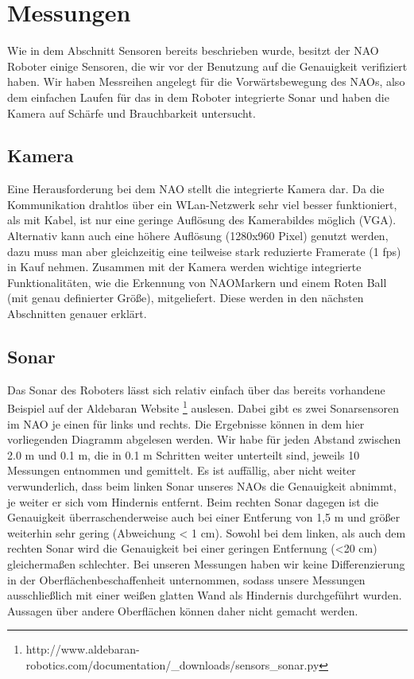 \section{Messungen}
Wie in dem Abschnitt Sensoren bereits beschrieben wurde, besitzt der NAO Roboter einige Sensoren, die wir vor der Benutzung auf die Genauigkeit verifiziert haben.
Wir haben Messreihen angelegt für die Vorwärtsbewegung des NAOs, also dem einfachen Laufen für das in dem Roboter integrierte Sonar und haben die Kamera auf Schärfe und Brauchbarkeit untersucht.

\subsection{Kamera}
Eine Herausforderung bei dem NAO stellt die integrierte Kamera dar. Da die Kommunikation drahtlos über ein WLan-Netzwerk sehr viel besser funktioniert, als mit Kabel, ist nur eine geringe Auflösung des Kamerabildes möglich (VGA). Alternativ kann auch eine höhere Auflösung (1280x960 Pixel) genutzt werden, dazu muss man aber gleichzeitig eine teilweise stark reduzierte Framerate (1 fps) in Kauf nehmen.
Zusammen mit der Kamera werden wichtige integrierte Funktionalitäten, wie die Erkennung von NAOMarkern und einem Roten Ball (mit genau definierter Größe), mitgeliefert. Diese werden in den nächsten Abschnitten genauer erklärt.

\subsection{Sonar}
Das Sonar des Roboters lässt sich relativ einfach über das bereits vorhandene Beispiel auf der Aldebaran Website%
	\footnote{http://www.aldebaran-robotics.com/documentation/\_downloads/sensors\_sonar.py} auslesen. Dabei gibt es zwei Sonarsensoren im NAO je einen für links und rechts. Die Ergebnisse können in dem hier vorliegenden Diagramm abgelesen werden. Wir habe für jeden Abstand zwischen 2.0 m und 0.1 m, die in 0.1 m Schritten weiter unterteilt sind, jeweils 10 Messungen entnommen und gemittelt. 
Es ist auffällig, aber nicht weiter verwunderlich, dass beim linken Sonar unseres NAOs die Genauigkeit abnimmt, je weiter er sich vom Hindernis entfernt. Beim rechten Sonar dagegen ist die Genauigkeit überraschenderweise auch bei einer Entferung von 1,5 m und größer weiterhin sehr gering (Abweichung < 1 cm). Sowohl bei dem linken, als auch dem rechten Sonar wird die Genauigkeit bei einer geringen Entfernung (<20 cm) gleichermaßen schlechter. 
Bei unseren Messungen haben wir keine Differenzierung in der Oberflächenbeschaffenheit unternommen, sodass unsere Messungen ausschließlich mit einer weißen glatten Wand als Hindernis durchgeführt wurden. Aussagen über andere Oberflächen können daher nicht gemacht werden.

